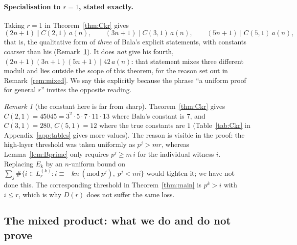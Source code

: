 \documentclass[11pt]{article}
\theoremstyle{plain}
\theoremstyle{definition}
\theoremstyle{remark}
\newtheorem{nremark}[theorem]{Remark}
\numberwithin{equation}{section}
\begin{document}
\paragraph{Specialisation to $r=1$, stated exactly.} Taking $r=1$ in Theorem~\ref{thm:Ckr} gives
\[
  (2n+1) \mid C(2,1)\,a(n), \qquad (3n+1)\mid C(3,1)\,a(n), \qquad (5n+1)\mid C(5,1)\,a(n),
\]
that is, the qualitative form of \emph{three} of Bala's explicit statements, with constants
coarser than his (Remark~\ref{rem:Ckr-loose}). It does \emph{not} give his fourth,
$(2n+1)(3n+1)(5n+1) \mid 42\,a(n)$: that statement mixes three different moduli and lies outside
the scope of this theorem, for the reason set out in Remark~\ref{rem:mixed}. We say this
explicitly because the phrase ``a uniform proof for general $r$'' invites the opposite reading.

\begin{nremark}[the constant here is far from sharp]
\label{rem:Ckr-loose}
Theorem~\ref{thm:Ckr} gives $C(2,1) = 45045 = 3^2\cdot 5\cdot 7\cdot 11\cdot 13$ where Bala's
constant is $7$, and $C(3,1) = 280$, $C(5,1) = 12$ where the true constants are $1$
(Table~\ref{tab:Ckr} in Appendix~\ref{app:tables} gives more values). The reason
is visible in the proof: the high-layer threshold was taken uniformly as $p^j > mr$, whereas
Lemma~\ref{lem:Bprime} only requires $p^j \ge m\,i$ for the individual witness $i$. Replacing
$E_k$ by an $n$-uniform bound on $\sum_j \#\{ i \in L^{(k)}_r : i \equiv -kn \ (\mathrm{mod}\
p^j),\ p^j < mi\}$ would tighten it; we have not done this. The corresponding threshold in
Theorem~\ref{thm:main} is $p^k > i$ with $i \le r$, which is why $D(r)$ does not suffer the same
loss.
\end{nremark}

\subsection{The mixed product: what we do and do not prove}
\label{sec:mixed}
\end{document}
